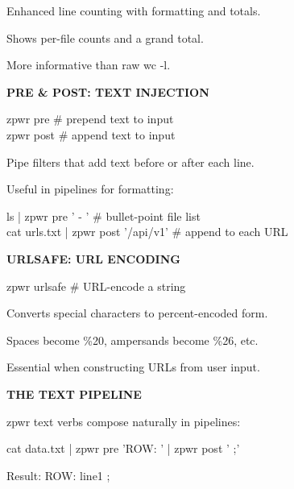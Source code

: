 \documentclass[11pt,a4paper,twoside]{book}
\begin{document}
Enhanced line counting with formatting and totals.

Shows per-file counts and a grand total.

More informative than raw wc -l.


\vspace{12pt}
{\bfseries\color{neonyellow} PRE \& POST: TEXT INJECTION}\vspace{4pt}

\begin{codebox}
zpwr pre                            \# prepend text to input\\
zpwr post                           \# append text to input\\
\end{codebox}

Pipe filters that add text before or after each line.

Useful in pipelines for formatting:

\begin{codebox}
ls | zpwr pre '  - '               \# bullet-point file list\\
cat urls.txt | zpwr post '/api/v1'  \# append to each URL\\
\end{codebox}


\vspace{12pt}
{\bfseries\color{neonyellow} URLSAFE: URL ENCODING}\vspace{4pt}

\begin{codebox}
zpwr urlsafe                        \# URL-encode a string\\
\end{codebox}

Converts special characters to percent-encoded form.

Spaces become \%20, ampersands become \%26, etc.

Essential when constructing URLs from user input.


\vspace{12pt}
{\bfseries\color{neonyellow} THE TEXT PIPELINE}\vspace{4pt}

zpwr text verbs compose naturally in pipelines:

\begin{codebox}
cat data.txt | zpwr pre 'ROW: ' | zpwr post ' ;'\\
\end{codebox}

Result: ROW: line1 ;
\end{document}
